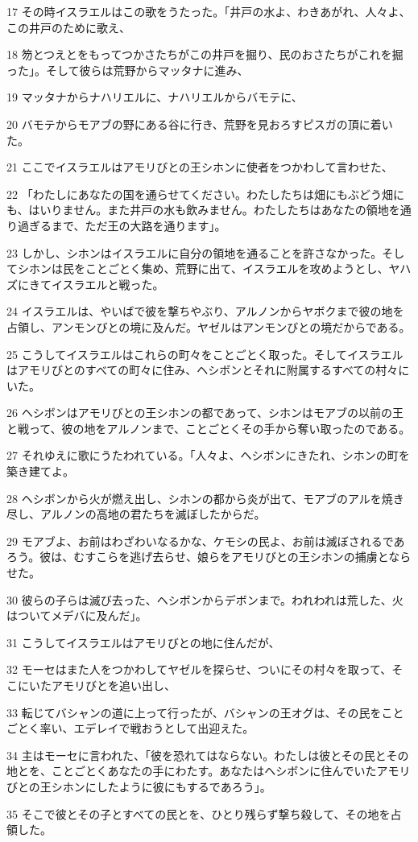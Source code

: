 \par 17 その時イスラエルはこの歌をうたった。「井戸の水よ、わきあがれ、人々よ、この井戸のために歌え、
\par 18 笏とつえとをもってつかさたちがこの井戸を掘り、民のおさたちがこれを掘った」。そして彼らは荒野からマッタナに進み、
\par 19 マッタナからナハリエルに、ナハリエルからバモテに、
\par 20 バモテからモアブの野にある谷に行き、荒野を見おろすピスガの頂に着いた。
\par 21 ここでイスラエルはアモリびとの王シホンに使者をつかわして言わせた、
\par 22 「わたしにあなたの国を通らせてください。わたしたちは畑にもぶどう畑にも、はいりません。また井戸の水も飲みません。わたしたちはあなたの領地を通り過ぎるまで、ただ王の大路を通ります」。
\par 23 しかし、シホンはイスラエルに自分の領地を通ることを許さなかった。そしてシホンは民をことごとく集め、荒野に出て、イスラエルを攻めようとし、ヤハズにきてイスラエルと戦った。
\par 24 イスラエルは、やいばで彼を撃ちやぶり、アルノンからヤボクまで彼の地を占領し、アンモンびとの境に及んだ。ヤゼルはアンモンびとの境だからである。
\par 25 こうしてイスラエルはこれらの町々をことごとく取った。そしてイスラエルはアモリびとのすべての町々に住み、ヘシボンとそれに附属するすべての村々にいた。
\par 26 ヘシボンはアモリびとの王シホンの都であって、シホンはモアブの以前の王と戦って、彼の地をアルノンまで、ことごとくその手から奪い取ったのである。
\par 27 それゆえに歌にうたわれている。「人々よ、ヘシボンにきたれ、シホンの町を築き建てよ。
\par 28 ヘシボンから火が燃え出し、シホンの都から炎が出て、モアブのアルを焼き尽し、アルノンの高地の君たちを滅ぼしたからだ。
\par 29 モアブよ、お前はわざわいなるかな、ケモシの民よ、お前は滅ぼされるであろう。彼は、むすこらを逃げ去らせ、娘らをアモリびとの王シホンの捕虜とならせた。
\par 30 彼らの子らは滅び去った、ヘシボンからデボンまで。われわれは荒した、火はついてメデバに及んだ」。
\par 31 こうしてイスラエルはアモリびとの地に住んだが、
\par 32 モーセはまた人をつかわしてヤゼルを探らせ、ついにその村々を取って、そこにいたアモリびとを追い出し、
\par 33 転じてバシャンの道に上って行ったが、バシャンの王オグは、その民をことごとく率い、エデレイで戦おうとして出迎えた。
\par 34 主はモーセに言われた、「彼を恐れてはならない。わたしは彼とその民とその地とを、ことごとくあなたの手にわたす。あなたはヘシボンに住んでいたアモリびとの王シホンにしたように彼にもするであろう」。
\par 35 そこで彼とその子とすべての民とを、ひとり残らず撃ち殺して、その地を占領した。

